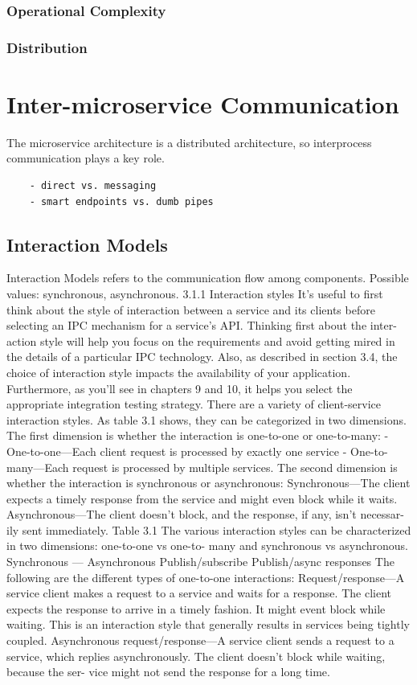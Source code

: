 \documentclass[thesis=M,english,hidelinks]{FITthesis}[2012/10/20]
\begin{document}
\subsubsection{Operational Complexity}
\subsubsection{Distribution}




% 
% 

\section{Inter-microservice Communication}
The microservice architecture is a distributed architecture, so interprocess communication plays a key role.
\begin{verbatim}
    - direct vs. messaging
    - smart endpoints vs. dumb pipes
\end{verbatim}

\subsection{Interaction Models}
Interaction Models refers to the communication flow among components. Possible values: synchronous, asynchronous.
3.1.1 Interaction styles
It’s useful to first think about the style of interaction between a service and its clients before selecting an IPC mechanism for a service’s API. Thinking first about the inter- action style will help you focus on the requirements and avoid getting mired in the details of a particular IPC technology. Also, as described in section 3.4, the choice of interaction style impacts the availability of your application. Furthermore, as you’ll see in chapters 9 and 10, it helps you select the appropriate integration testing strategy.
There are a variety of client-service interaction styles. As table 3.1 shows, they can be categorized in two dimensions. The first dimension is whether the interaction is one-to-one or one-to-many:
- One-to-one—Each client request is processed by exactly one service
- One-to-many—Each request is processed by multiple services.
The second dimension is whether the interaction is synchronous or asynchronous:
Synchronous—The client expects a timely response from the service and might even block while it waits.
Asynchronous—The client doesn’t block, and the response, if any, isn’t necessar- ily sent immediately.
Table 3.1 The various interaction styles can be characterized in two dimensions: one-to-one vs one-to- many and synchronous vs asynchronous.
Synchronous —
Asynchronous Publish/subscribe Publish/async responses
The following are the different types of one-to-one interactions:
Request/response—A service client makes a request to a service and waits for a response. The client expects the response to arrive in a timely fashion. It might event block while waiting. This is an interaction style that generally results in services being tightly coupled.
Asynchronous request/response—A service client sends a request to a service, which replies asynchronously. The client doesn’t block while waiting, because the ser- vice might not send the response for a long time.
\end{document}
